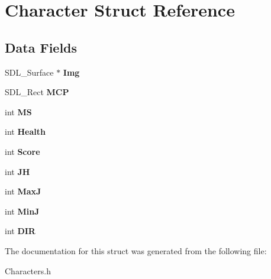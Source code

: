 \hypertarget{structCharacter}{}\section{Character Struct Reference}
\label{structCharacter}
\subsection*{Data Fields}
\begin{DoxyCompactItemize}
\item 
\mbox{\label{structCharacter_a462eed4146ae39c1eaab25437a0cc8de}} 
S\+D\+L\+\_\+\+Surface $\ast$ {\bfseries Img}
\item 
\mbox{\label{structCharacter_ab0412b5a31e8973c5bbd1c19b365f588}} 
S\+D\+L\+\_\+\+Rect {\bfseries M\+CP}
\item 
\mbox{\label{structCharacter_ab423ab699b9ca78297b3250b2b6c150b}} 
int {\bfseries MS}
\item 
\mbox{\label{structCharacter_a8e32386da2ba8f6877c8f874bc893ae6}} 
int {\bfseries Health}
\item 
\mbox{\label{structCharacter_af434ce239281b18e067752007fad03c3}} 
int {\bfseries Score}
\item 
\mbox{\label{structCharacter_aec24b1fe4752fcede5dc5807772ee51b}} 
int {\bfseries JH}
\item 
\mbox{\label{structCharacter_ad423312988eff69c385f1f0124b18005}} 
int {\bfseries MaxJ}
\item 
\mbox{\label{structCharacter_abd8dd2c5c6e16037a0d11f102db34c4d}} 
int {\bfseries MinJ}
\item 
\mbox{\label{structCharacter_a1a897f31268e97faaf2ff166569bdb0c}} 
int {\bfseries D\+IR}
\end{DoxyCompactItemize}


The documentation for this struct was generated from the following file\+:\begin{DoxyCompactItemize}
\item 
Characters.\+h\end{DoxyCompactItemize}
